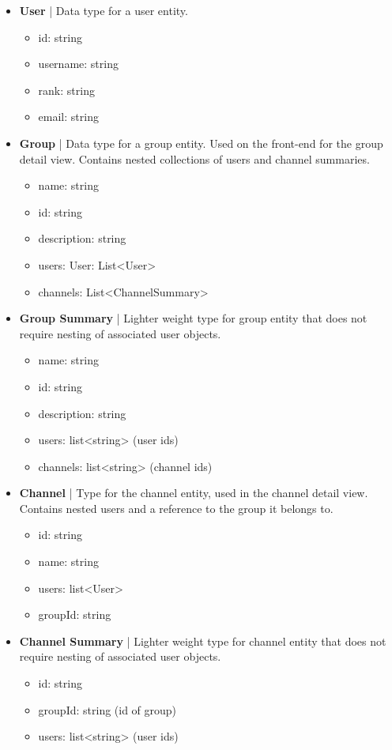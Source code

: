 \documentclass[11pt, conference,letterpaper]{IEEEtran}
\begin{document}
\begin{itemize}
    \item \textbf{User} | Data type for a user entity.
        \begin{itemize}
            \item id: string
            \item username: string
            \item rank: string
            \item email: string
        \end{itemize}
    \item \textbf{Group} | Data type for a group entity. Used on the front-end for the group detail view. Contains nested collections of users and channel summaries.
        \begin{itemize}
            \item name: string
            \item id: string
            \item description: string
            \item users: User: List<User>
            \item channels: List<ChannelSummary>
        \end{itemize}
    \item \textbf{Group Summary} | Lighter weight type for group entity that does not require nesting of associated user objects.
        \begin{itemize}
            \item name: string
            \item id: string
            \item description: string
            \item users: list<string> (user ids)
            \item channels: list<string> (channel ids)
        \end{itemize}
    \item \textbf{Channel} | Type for the channel entity, used in the channel detail view. Contains nested users and a reference to the group it belongs to.
        \begin{itemize}
            \item id: string
            \item name: string
            \item users: list<User>
            \item groupId: string
        \end{itemize}
    \item \textbf{Channel Summary} | Lighter weight type for channel entity that does not require nesting of associated user objects.
        \begin{itemize}
            \item id: string
            \item groupId: string (id of group)
            \item users: list<string> (user ids)
        \end{itemize}
\end{itemize}
\end{document}
